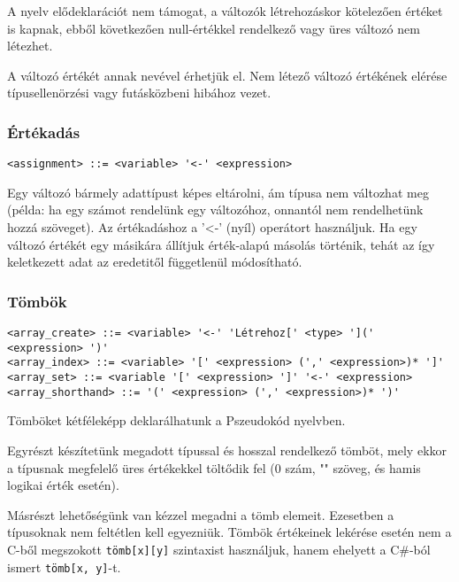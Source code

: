 A nyelv elődeklarációt nem támogat, a változók létrehozáskor kötelezően értéket is kapnak, ebből következően null-értékkel rendelkező vagy üres változó nem létezhet.

A változó értékét annak nevével érhetjük el. Nem létező változó értékének elérése típusellenörzési vagy futásközbeni hibához vezet.

\subsubsection{Értékadás}

\begin{footnotesize}
\begin{verbatim}
<assignment> ::= <variable> '<-' <expression>
\end{verbatim}
\end{footnotesize}

Egy változó bármely adattípust képes eltárolni, ám típusa nem változhat meg (példa: ha egy számot rendelünk egy változóhoz, onnantól nem rendelhetünk hozzá szöveget). Az értékadáshoz a '<-' (nyíl) operátort használjuk. Ha egy változó értékét egy másikára állítjuk érték-alapú másolás történik, tehát az így keletkezett adat az eredetitől függetlenül módosítható.

\subsubsection{Tömbök}

\begin{footnotesize}
\begin{verbatim}
<array_create> ::= <variable> '<-' 'Létrehoz[' <type> '](' <expression> ')'
<array_index> ::= <variable> '[' <expression> (',' <expression>)* ']'
<array_set> ::= <variable '[' <expression> ']' '<-' <expression>
<array_shorthand> ::= '(' <expression> (',' <expression>)* ')'
\end{verbatim}
\end{footnotesize}

Tömböket kétféleképp deklarálhatunk a Pszeudokód nyelvben.

Egyrészt készítetünk megadott típussal és hosszal rendelkező tömböt, mely ekkor a típusnak megfelelő üres értékekkel töltődik fel (0 szám, "" szöveg, és hamis logikai érték esetén). 

Másrészt lehetőségünk van kézzel megadni a tömb elemeit. Ezesetben a típusoknak nem feltétlen kell egyezniük. Tömbök értékeinek lekérése esetén nem a C-ből megszokott \verb|tömb[x][y]| szintaxist használjuk, hanem ehelyett a C\#-ból ismert \verb|tömb[x, y]|-t.

